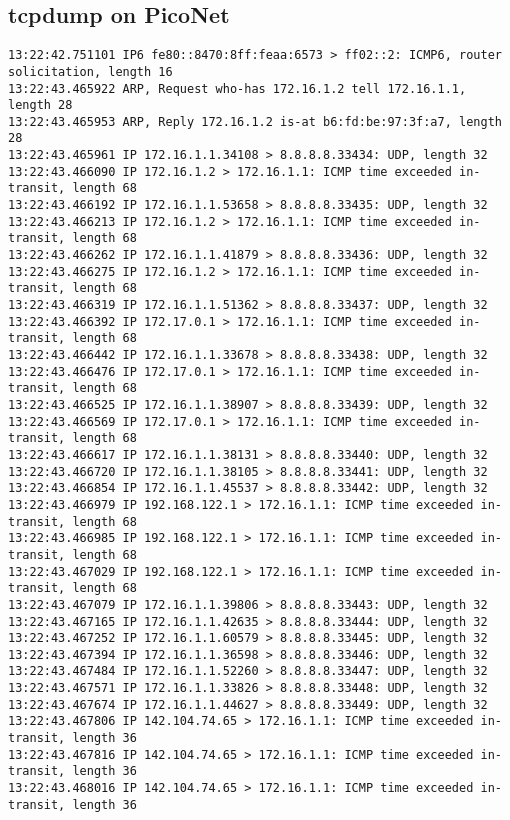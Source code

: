 \documentclass[
	letterpaper, %
	10pt, %
]{CSUniSchoolLabReport}
\begin{document}
\subsection{tcpdump on PicoNet}
\begin{center}
\begin{verbatim}
13:22:42.751101 IP6 fe80::8470:8ff:feaa:6573 > ff02::2: ICMP6, router solicitation, length 16
13:22:43.465922 ARP, Request who-has 172.16.1.2 tell 172.16.1.1, length 28
13:22:43.465953 ARP, Reply 172.16.1.2 is-at b6:fd:be:97:3f:a7, length 28
13:22:43.465961 IP 172.16.1.1.34108 > 8.8.8.8.33434: UDP, length 32
13:22:43.466090 IP 172.16.1.2 > 172.16.1.1: ICMP time exceeded in-transit, length 68
13:22:43.466192 IP 172.16.1.1.53658 > 8.8.8.8.33435: UDP, length 32
13:22:43.466213 IP 172.16.1.2 > 172.16.1.1: ICMP time exceeded in-transit, length 68
13:22:43.466262 IP 172.16.1.1.41879 > 8.8.8.8.33436: UDP, length 32
13:22:43.466275 IP 172.16.1.2 > 172.16.1.1: ICMP time exceeded in-transit, length 68
13:22:43.466319 IP 172.16.1.1.51362 > 8.8.8.8.33437: UDP, length 32
13:22:43.466392 IP 172.17.0.1 > 172.16.1.1: ICMP time exceeded in-transit, length 68
13:22:43.466442 IP 172.16.1.1.33678 > 8.8.8.8.33438: UDP, length 32
13:22:43.466476 IP 172.17.0.1 > 172.16.1.1: ICMP time exceeded in-transit, length 68
13:22:43.466525 IP 172.16.1.1.38907 > 8.8.8.8.33439: UDP, length 32
13:22:43.466569 IP 172.17.0.1 > 172.16.1.1: ICMP time exceeded in-transit, length 68
13:22:43.466617 IP 172.16.1.1.38131 > 8.8.8.8.33440: UDP, length 32
13:22:43.466720 IP 172.16.1.1.38105 > 8.8.8.8.33441: UDP, length 32
13:22:43.466854 IP 172.16.1.1.45537 > 8.8.8.8.33442: UDP, length 32
13:22:43.466979 IP 192.168.122.1 > 172.16.1.1: ICMP time exceeded in-transit, length 68
13:22:43.466985 IP 192.168.122.1 > 172.16.1.1: ICMP time exceeded in-transit, length 68
13:22:43.467029 IP 192.168.122.1 > 172.16.1.1: ICMP time exceeded in-transit, length 68
13:22:43.467079 IP 172.16.1.1.39806 > 8.8.8.8.33443: UDP, length 32
13:22:43.467165 IP 172.16.1.1.42635 > 8.8.8.8.33444: UDP, length 32
13:22:43.467252 IP 172.16.1.1.60579 > 8.8.8.8.33445: UDP, length 32
13:22:43.467394 IP 172.16.1.1.36598 > 8.8.8.8.33446: UDP, length 32
13:22:43.467484 IP 172.16.1.1.52260 > 8.8.8.8.33447: UDP, length 32
13:22:43.467571 IP 172.16.1.1.33826 > 8.8.8.8.33448: UDP, length 32
13:22:43.467674 IP 172.16.1.1.44627 > 8.8.8.8.33449: UDP, length 32
13:22:43.467806 IP 142.104.74.65 > 172.16.1.1: ICMP time exceeded in-transit, length 36
13:22:43.467816 IP 142.104.74.65 > 172.16.1.1: ICMP time exceeded in-transit, length 36
13:22:43.468016 IP 142.104.74.65 > 172.16.1.1: ICMP time exceeded in-transit, length 36

\end{verbatim}
\end{center}
\end{document}
